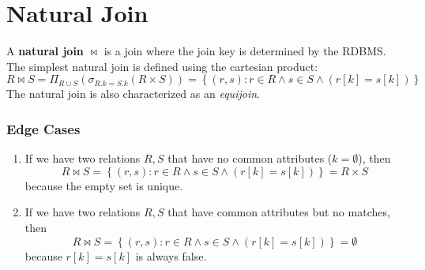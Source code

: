 \documentclass{report}
\newenvironment{definition}[1]{\begin{tcolorbox}[title={Definition: #1}]}{\end{tcolorbox}}
\renewcommand{\bf}[1]{\textbf{{#1}}}
\renewcommand{\it}[1]{\textit{{#1}}}
\begin{document}
\section{Natural Join}
\begin{definition}{Natural Join}
    A \bf{natural join} $\bowtie$ is a join where the join key is determined by the RDBMS. The
    simplest natural join is defined using the cartesian product:
    \[
        R \bowtie S 
        = \Pi_{R \cup S} \left( \sigma_{R.k = S.k} (R \times S) \right) 
        = \left\{ (r, s) : r \in R \land s \in S \land (r[k] = s[k]) \right\}
    \]
    The natural join is also characterized as an \it{equijoin}.
\end{definition}

\subsubsection{Edge Cases}
\begin{enumerate}
    \item If we have two relations $R, S$ that have no common attributes ($k = \emptyset$), then
        \[
            R \bowtie S 
            = \left\{ (r, s) : r \in R \land s \in S \land (r[k] = s[k]) \right\} 
            = R \times S
        \]
        because the empty set is unique.
    \item If we have two relations $R, S$ that have common attributes but no matches, then
        \[
            R \bowtie S 
            = \left\{ (r, s) : r \in R \land s \in S \land (r[k] = s[k]) \right\} 
            = \emptyset
        \]
        because $r[k] = s[k]$ is always false.
\end{enumerate}
\end{document}
